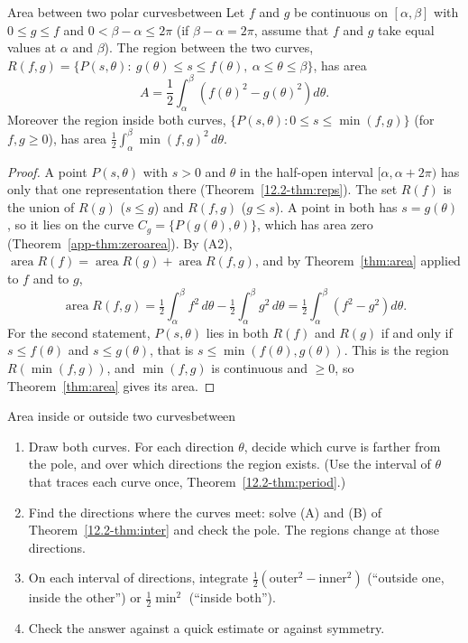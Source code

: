 \documentclass[11pt]{article}
\begin{document}
\begin{thm}{Area between two polar curves}{between}
Let $f$ and $g$ be continuous on $[\alpha,\beta]$ with $0\le g\le f$ and $0<\beta-\alpha\le2\pi$ (if $\beta-\alpha=2\pi$, assume that $f$ and $g$ take equal values at $\alpha$ and $\beta$). The region between the two curves,
$R(f,g)=\{P(s,\theta):\ g(\theta)\le s\le f(\theta),\ \alpha\le\theta\le\beta\}$, has area
\[
A=\frac12\int_\alpha^\beta\left(f(\theta)^2-g(\theta)^2\right)d\theta .
\]
Moreover the region inside both curves, $\{P(s,\theta):0\le s\le\min(f,g)\}$ (for $f,g\ge0$), has area $\frac12\int_\alpha^\beta\min(f,g)^2\,d\theta$.
\end{thm}
\begin{proof}
A point $P(s,\theta)$ with $s>0$ and $\theta$ in the half-open interval $[\alpha,\alpha+2\pi)$ has only that one representation there (Theorem~\ref{12.2-thm:reps}). The set $R(f)$ is the union of $R(g)$ ($s\le g$) and $R(f,g)$ ($g\le s$). A point in both has $s=g(\theta)$, so it lies on the curve $C_g=\{P(g(\theta),\theta)\}$, which has area zero (Theorem~\ref{app-thm:zeroarea}). By (A2), $\operatorname{area}R(f)=\operatorname{area}R(g)+\operatorname{area}R(f,g)$, and by Theorem~\ref{thm:area} applied to $f$ and to $g$,
\[
\operatorname{area}R(f,g)=\tfrac12\int_\alpha^\beta f^2\,d\theta-\tfrac12\int_\alpha^\beta g^2\,d\theta=\tfrac12\int_\alpha^\beta\left(f^2-g^2\right)d\theta .
\]
For the second statement, $P(s,\theta)$ lies in both $R(f)$ and $R(g)$ if and only if $s\le f(\theta)$ and $s\le g(\theta)$, that is $s\le\min(f(\theta),g(\theta))$. This is the region $R(\min(f,g))$, and $\min(f,g)$ is continuous and $\ge0$, so Theorem~\ref{thm:area} gives its area.
\end{proof}

\begin{proc}{Area inside or outside two curves}{between}
\begin{enumerate}[nosep]
  \item Draw both curves. For each direction $\theta$, decide which curve is farther from the pole, and over which directions the region exists. (Use the interval of $\theta$ that traces each curve once, Theorem~\ref{12.2-thm:period}.)
  \item Find the directions where the curves meet: solve (A) and (B) of Theorem~\ref{12.2-thm:inter} and check the pole. The regions change at those directions.
  \item On each interval of directions, integrate $\frac12(\text{outer}^2-\text{inner}^2)$ (``outside one, inside the other'') or $\frac12\min^2$ (``inside both'').
  \item Check the answer against a quick estimate or against symmetry.
\end{enumerate}
\end{proc}
\end{document}
